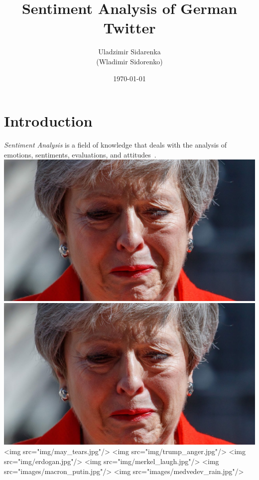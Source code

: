 \documentclass{beamer}
\title[]{Sentiment Analysis of German Twitter}
\author[Sidarenka]{Uladzimir Sidarenka\\(Wladimir Sidorenko)}
\institute[University of Potsdam]{University of Potsdam}
\date{\today}
\newlength{\picwidth}
\newlength{\picheight}
\begin{document}
\begin{frame}{}
  \titlepage{}
\end{frame}


\section{Introduction}
\begin{frame}{}
\emph{Sentiment Analysis} is a field of knowledge that deals with the
analysis of emotions, sentiments, evaluations, and
attitudes~\cite{Liu:12}.
\includegraphics[width=\picwidth,height=\picheight]{img/may_tears.jpg}
\includegraphics[width=\picwidth,height=\picheight]{img/may_tears.jpg}
<img src="img/may_tears.jpg"/>
<img src="img/trump_anger.jpg"/>
<img src="img/erdogan.jpg"/>
<img src="img/merkel_laugh.jpg"/>
<img src="images/macron_putin.jpg"/>
<img src="images/medvedev_rain.jpg"/>
\end{frame}
\end{document}
